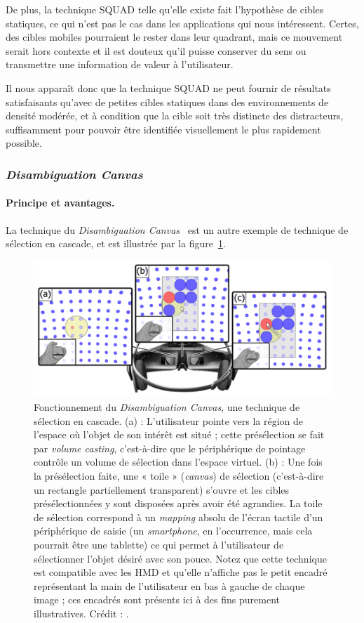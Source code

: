 	De plus, la technique SQUAD telle qu'elle existe fait l'hypothèse de cibles statiques, ce qui n'est pas le cas dans les applications qui nous intéressent. Certes, des cibles mobiles pourraient le rester dans leur quadrant, mais ce mouvement serait hors contexte et il est douteux qu'il puisse conserver du sens ou transmettre une information de valeur à l'utilisateur.
	
	Il nous apparaît donc que la technique SQUAD ne peut fournir de résultats satisfaisants qu'avec de petites cibles statiques dans des environnements de densité modérée, et à condition que la cible soit très distincte des distracteurs, suffisamment pour pouvoir être identifiée visuellement le plus rapidement possible.
	
	\subsubsection{\emph{Disambiguation Canvas}}
	\paragraph{Principe et avantages.}
	La technique du \emph{Disambiguation Canvas}~\cite{debarba2013disambiguation} est un autre exemple de technique de sélection en cascade, et est illustrée par la figure~\ref{fig:dCanvas}.
		 
	\begin{figure}[H]
		\centering
		\includegraphics[width=\textwidth]{figures/ch2/dCanvas}
		\caption[\emph{Disambiguation Canvas}]{Fonctionnement du \emph{Disambiguation Canvas}, une technique de sélection en cascade. (a) : L'utilisateur pointe vers la région de l'espace où l'objet de son intérêt est situé ; cette présélection se fait par \emph{volume casting}, c'est-à-dire que le périphérique de pointage contrôle un volume de sélection dans l'espace virtuel. (b) : Une fois la présélection faite, une « toile » (\emph{canvas}) de sélection (c'est-à-dire un rectangle partiellement transparent) s'ouvre et les cibles présélectionnées y sont disposées après avoir été agrandies. La toile de sélection correspond à un \emph{mapping} absolu de l'écran tactile d'un périphérique de saisie (un \emph{smartphone}, en l'occurrence, mais cela pourrait être une tablette) ce qui permet à l'utilisateur de sélectionner l'objet désiré avec son pouce. Notez que cette technique est compatible avec les HMD et qu'elle n'affiche pas le petit encadré représentant la main de l'utilisateur en bas à gauche de chaque image ; ces encadrés sont présents ici à des fins purement illustratives. Crédit : \cite{debarba2013disambiguation}.}
		\label{fig:dCanvas}
	\end{figure}
	
